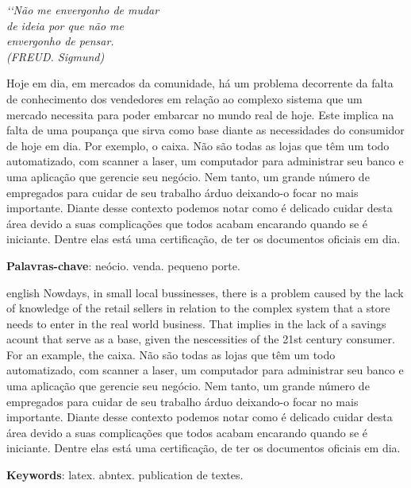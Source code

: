 \documentclass[12pt, openright, twoside, article, a4paper, brazil]{abntex2}
\begin{document}
\imprimircapa
\imprimirfolhaderosto

\begin{epigrafe}
\vspace*{\fill}
\begin{flushright}
\textit{‘‘Não me envergonho de mudar \\
de ideia por que não me \\
envergonho de pensar.\\
(FREUD. Sigmund)}
\end{flushright}
\end{epigrafe}
\clearpage

\begin{resumo}
Hoje em dia, em mercados da comunidade, há um problema decorrente da falta de 
conhecimento dos vendedores em relação ao complexo sistema que um mercado 
necessita para poder embarcar no mundo real de hoje. Este implica na falta de 
uma poupança que sirva como base diante as necessidades do consumidor de hoje 
em dia. Por exemplo, o caixa. Não são todas as lojas que têm um todo 
automatizado, com scanner a laser, um computador para administrar seu banco e 
uma aplicação que gerencie seu negócio. Nem tanto, um grande número de 
empregados para cuidar de seu trabalho árduo deixando-o focar no mais 
importante. Diante desse contexto podemos notar como é delicado cuidar desta 
área devido a suas complicações que todos acabam encarando quando se é 
iniciante. Dentre elas está uma certificação, de ter os documentos oficiais em 
dia.

\vspace{\onelineskip}
\noindent
\textbf{Palavras-chave}: neócio. venda. pequeno porte.
\end{resumo}
\clearpage

\begin{resumo}[Resume]
\begin{otherlanguage*}{english}
Nowdays, in small local bussinesses, there is a problem caused by the lack of 
knowledge of the retail sellers in relation to the complex system that a 
store needs to enter in the real world business. That implies in the lack of a
savings acount that serve as a base, given the nescessities of the 21st century
consumer. For an example, the caixa. Não são todas as lojas que têm um todo 
automatizado, com scanner a laser, um computador para administrar seu banco e 
uma aplicação que gerencie seu negócio. Nem tanto, um grande número de 
empregados para cuidar de seu trabalho árduo deixando-o focar no mais 
importante. Diante desse contexto podemos notar como é delicado cuidar desta 
área devido a suas complicações que todos acabam encarando quando se é 
iniciante. Dentre elas está uma certificação, de ter os documentos oficiais em 
dia.

\vspace{\onelineskip}
\noindent
\textbf{Keywords}: latex. abntex. publication de textes.
\end{otherlanguage*}
\end{resumo}
\end{document}
